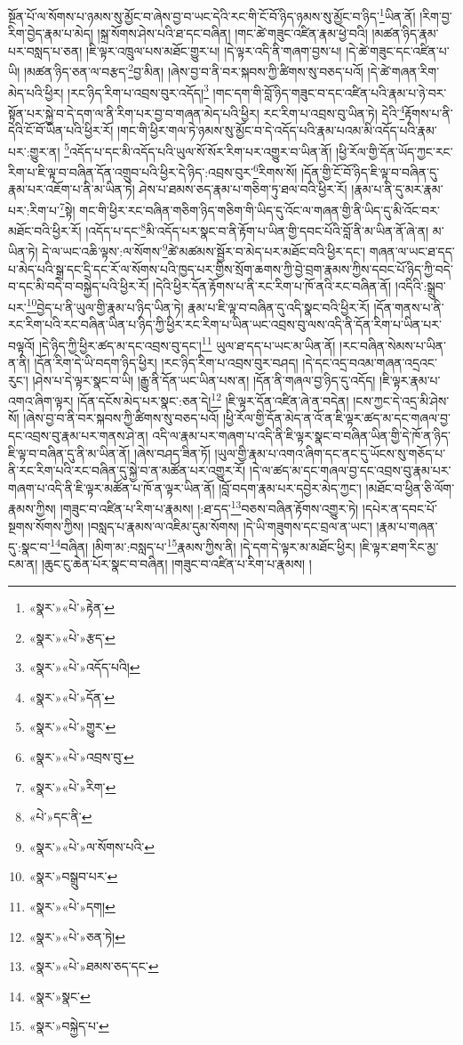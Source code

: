 སྔོན་པོ་ལ་སོགས་པ་ཉམས་སུ་མྱོང་བ་ཞེས་བྱ་བ་ཡང་དེའི་རང་གི་ངོ་བོ་ཉིད་ཉམས་སུ་མྱོང་བ་ཉིད་\footnote{«སྣར་»«པེ་»རྟེན་}ཡིན་ནོ། །རིག་བྱ་རིག་བྱེད་རྣམ་པ་མེད། །སྐྲ་སོགས་ཤེས་པའི་ཐ་དང་བཞིན། །གང་ཚེ་གཟུང་འཛིན་རྣམ་ཕྱེ་བའི། །མཚན་ཉིད་རྣམ་པར་བསླད་པ་ཅན། །ཇི་ལྟར་འཁྲུལ་པས་མཐོང་གྱུར་པ། །དེ་ལྟར་འདི་ནི་གཞག་བྱས་པ། །དེ་ཚེ་གཟུང་དང་འཛིན་པ་ཡི། །མཚན་ཉིད་ཅན་ལ་བརྩད་\footnote{«སྣར་»«པེ་»རྩད་}བྱ་མིན། །ཞེས་བྱ་བ་ནི་བར་སྐབས་ཀྱི་ཚིགས་སུ་བཅད་པའོ། །དེ་ཚེ་གཞན་རིག་མེད་པའི་ཕྱིར། །རང་ཉིད་རིག་པ་འབྲས་བུར་འདོད།\footnote{«སྣར་»«པེ་»འདོད་པའི།} །གང་དག་གི་བློ་ཉིད་གཟུང་བ་དང་འཛིན་པའི་རྣམ་པ་ཉེ་བར་སྟོན་པར་སྐྱེ་བ་དེ་དག་ལ་ནི་རིག་པར་བྱ་བ་གཞན་མེད་པའི་ཕྱིར། རང་རིག་པ་འབྲས་བུ་ཡིན་ཏེ། དེའི་\footnote{«སྣར་»«པེ་»དོན་}རྟོགས་པ་ནི་དེའི་ངོ་བོ་ཡིན་པའི་ཕྱིར་རོ། །གང་གི་ཕྱིར་གལ་ཏེ་ཉམས་སུ་མྱོང་བ་དེ་འདོད་པའི་རྣམ་པའམ་མི་འདོད་པའི་རྣམ་པར་:གྱུར་ན། \footnote{«སྣར་»«པེ་»གྱུར་}འདོད་པ་དང་མི་འདོད་པའི་ཡུལ་སོ་སོར་རིག་པར་འགྱུར་བ་ཡིན་ནོ། །ཕྱི་རོལ་གྱི་དོན་ཡོད་ཀྱང་རང་རིག་པ་ཇི་ལྟ་བ་བཞིན་དོན་འགྲུབ་པའི་ཕྱིར་དེ་ཉིད་:འབྲས་བུར་\footnote{«སྣར་»«པེ་»འབྲས་བུ་}རིགས་སོ། །དོན་གྱི་ངོ་བོ་ཉིད་ཇི་ལྟ་བ་བཞིན་དུ་རྣམ་པར་འཇོག་པ་ནི་མ་ཡིན་ཏེ། ཤེས་པ་ཐམས་ཅད་རྣམ་པ་གཅིག་ཏུ་ཐལ་བའི་ཕྱིར་རོ། །རྣམ་པ་ནི་དུ་མར་རྣམ་པར་:རིག་པ་\footnote{«སྣར་»«པེ་»རིག་}སྟེ། གང་གི་ཕྱིར་རང་བཞིན་གཅིག་ཉིད་གཅིག་གི་ཡིད་དུ་འོང་ལ་གཞན་གྱི་ནི་ཡིད་དུ་མི་འོང་བར་མཐོང་བའི་ཕྱིར་རོ། །འདོད་པ་དང་\footnote{«པེ་»དང་ནི་}མི་འདོད་པར་སྣང་བ་ནི་རྟོག་པ་ཡིན་གྱི་དབང་པོའི་བློ་ནི་མ་ཡིན་ནོ་ཞེ་ན། མ་ཡིན་ཏེ། དེ་ལ་ཡང་འཆི་ལྟས་:ལ་སོགས་\footnote{«སྣར་»«པེ་»ལ་སོགས་པའི་}ཚེ་མཚམས་སྦྱོར་བ་མེད་པར་མཐོང་བའི་ཕྱིར་དང་། གཞན་ལ་ཡང་ཐ་དད་པ་མེད་པའི་སྒྲ་དང་དྲི་དང་རོ་ལ་སོགས་པའི་ཁྱད་པར་གྱིས་སྲོག་ཆགས་ཀྱི་བྱེ་བྲག་རྣམས་ཀྱིས་དབང་པོ་ཉིད་ཀྱི་བདེ་བ་དང་མི་བདེ་བ་བསྐྱེད་པའི་ཕྱིར་རོ། །དེའི་ཕྱིར་དོན་རྟོགས་པ་ནི་རང་རིག་པ་ཁོ་ནའི་རང་བཞིན་ནོ། །འདིའི་:སྒྲུབ་པར་\footnote{«སྣར་»བསྒྲུབ་པར་}བྱེད་པ་ནི་ཡུལ་གྱི་རྣམ་པ་ཉིད་ཡིན་ཏེ། རྣམ་པ་ཇི་ལྟ་བ་བཞིན་དུ་འདི་སྣང་བའི་ཕྱིར་རོ། །དོན་གནས་པ་ནི་རང་རིག་པའི་རང་བཞིན་ཡིན་པ་ཉིད་ཀྱི་ཕྱིར་རང་རིག་པ་ཡིན་ཡང་འབྲས་བུ་ལས་འདི་ནི་དོན་རིག་པ་ཡིན་པར་བལྟའོ། །དེ་ཉིད་ཀྱི་ཕྱིར་ཚད་མ་དང་འབྲས་བུ་དང་།\footnote{«སྣར་»«པེ་»དག།} ཡུལ་ཐ་དད་པ་ཡང་མ་ཡིན་ནོ། །རང་བཞིན་སེམས་པ་ཡིན་ན་ནི། །དོན་རིག་དེ་ཡི་བདག་ཉིད་ཕྱིར། །རང་ཉིད་རིག་པ་འབྲས་བུར་བཤད། །དེ་དང་འདྲ་བའམ་གཞན་འདྲའང་རུང་། །ཤེས་པ་དེ་ལྟར་སྣང་བ་ཡི། །རྒྱུ་ནི་དོན་ཡང་ཡིན་པས་ན། །དོན་ནི་གཞལ་བྱ་ཉིད་དུ་འདོད། །ཇི་ལྟར་རྣམ་པ་འགའ་ཞིག་ལྟར། །དོན་དངོས་མེད་པར་སྣང་:ཅན་དེ།\footnote{«སྣར་»«པེ་»ཅན་ཏེ།} །ཇི་ལྟར་དོན་འཛིན་ཞེ་ན་བདེན། །ངས་ཀྱང་དེ་འདྲ་མི་ཤེས་སོ། །ཞེས་བྱ་བ་ནི་བར་སྐབས་ཀྱི་ཚིགས་སུ་བཅད་པའོ། །ཕྱི་རོལ་གྱི་དོན་མེད་ན་འོ་ན་ཇི་ལྟར་ཚད་མ་དང་གཞལ་བྱ་དང་འབྲས་བུ་རྣམ་པར་གནས་ཤེ་ན། འདི་ལ་རྣམ་པར་གཞག་པ་འདི་ནི་ཇི་ལྟར་སྣང་བ་བཞིན་ཡིན་གྱི་དེ་ཁོ་ན་ཉིད་ཇི་ལྟ་བ་བཞིན་དུ་ནི་མ་ཡིན་ནོ། །ཞེས་བཤད་ཟིན་ཏོ། །ཡུལ་གྱི་རྣམ་པ་འགའ་ཞིག་དང་ནང་དུ་ཡོངས་སུ་གཅོད་པ་ནི་རང་རིག་པའི་རང་བཞིན་དུ་སྐྱེ་བ་ན་མཚོན་པར་འགྱུར་རོ། །དེ་ལ་ཚད་མ་དང་གཞལ་བྱ་དང་འབྲས་བུ་རྣམ་པར་གཞག་པ་འདི་ནི་ཇི་ལྟར་མཚོན་པ་ཁོ་ན་ལྟར་ཡིན་ནོ། །བློ་བདག་རྣམ་པར་དབྱེར་མེད་ཀྱང་། །མཐོང་བ་ཕྱིན་ཅི་ལོག་རྣམས་ཀྱིས། །གཟུང་བ་འཛིན་པ་རིག་པ་རྣམས། །:ཐ་དད་\footnote{«སྣར་»«པེ་»ཐམས་ཅད་དང་}བཅས་བཞིན་རྟོགས་འགྱུར་ཏེ། །དཔེར་ན་དབང་པོ་སྔགས་སོགས་ཀྱིས། །བསླད་པ་རྣམས་ལ་འཇིམ་དུམ་སོགས། །དེ་ཡི་གཟུགས་དང་བྲལ་ན་ཡང་། །རྣམ་པ་གཞན་དུ་:སྣང་བ་\footnote{«སྣར་»སྣང་}བཞིན། །མིག་མ་:བསླད་པ་\footnote{«སྣར་»བསྐྱེད་པ་}རྣམས་ཀྱིས་ནི། །དེ་དག་དེ་ལྟར་མ་མཐོང་ཕྱིར། །ཇི་ལྟར་ཐག་རིང་མྱ་ངམ་ན། །ཆུང་ངུ་ཆེན་པོར་སྣང་བ་བཞིན། །གཟུང་བ་འཛིན་པ་རིག་པ་རྣམས། །
